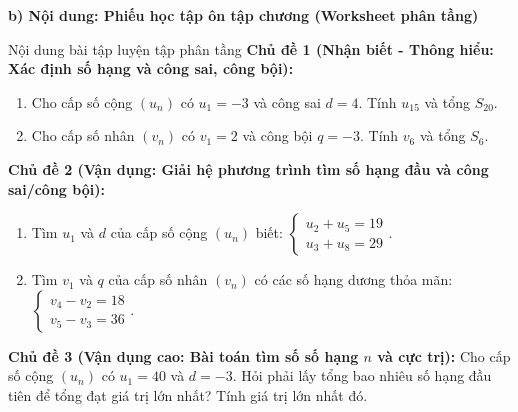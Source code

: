 \documentclass[12pt, a4paper]{article}
\begin{document}
\noindent \textbf{b) Nội dung: Phiếu học tập ôn tập chương (Worksheet phân tầng)}
\begin{pedabox}{Nội dung bài tập luyện tập phân tầng}
\textbf{Chủ đề 1 (Nhận biết - Thông hiểu: Xác định số hạng và công sai, công bội):}
\begin{enumerate}[leftmargin=0.6cm]
    \item Cho cấp số cộng $(u_n)$ có $u_1 = -3$ và công sai $d = 4$. Tính $u_{15}$ và tổng $S_{20}$.
    \item Cho cấp số nhân $(v_n)$ có $v_1 = 2$ và công bội $q = -3$. Tính $v_6$ và tổng $S_6$.
\end{enumerate}
\textbf{Chủ đề 2 (Vận dụng: Giải hệ phương trình tìm số hạng đầu và công sai/công bội):}
\begin{enumerate}[leftmargin=0.6cm]
    \item Tìm $u_1$ và $d$ của cấp số cộng $(u_n)$ biết: $\begin{cases} u_2 + u_5 = 19 \\ u_3 + u_8 = 29 \end{cases}$.
    \item Tìm $v_1$ và $q$ của cấp số nhân $(v_n)$ có các số hạng dương thỏa mãn: $\begin{cases} v_4 - v_2 = 18 \\ v_5 - v_3 = 36 \end{cases}$.
\end{enumerate}
\textbf{Chủ đề 3 (Vận dụng cao: Bài toán tìm số số hạng $n$ và cực trị):}
Cho cấp số cộng $(u_n)$ có $u_1 = 40$ và $d = -3$. Hỏi phải lấy tổng bao nhiêu số hạng đầu tiên để tổng đạt giá trị lớn nhất? Tính giá trị lớn nhất đó.
\end{pedabox}
\end{document}
